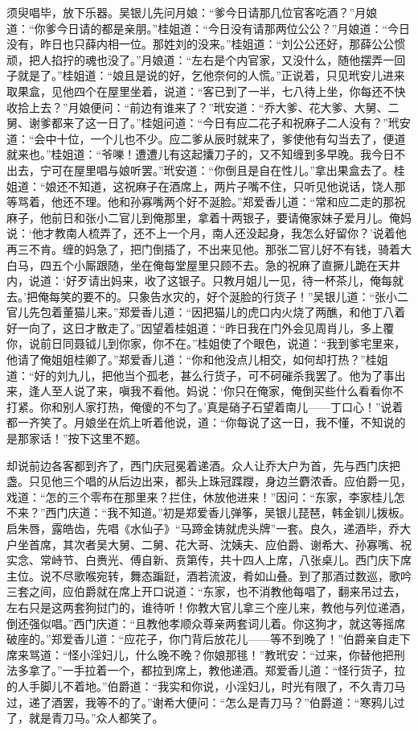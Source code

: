 须臾唱毕，放下乐器。吴银儿先问月娘：“爹今日请那几位官客吃酒？”月娘道：“你爹今日请的都是亲朋。”桂姐道：“今日没有请那两位公公？”月娘道：“今日没有，昨日也只薛内相一位。那姓刘的没来。”桂姐道：“刘公公还好，那薛公公惯顽，把人掐拧的魂也没了。”月娘道：“左右是个内官家，又没什么，随他摆弄一回子就是了。”桂姐道：“娘且是说的好，乞他奈何的人慌。”正说着，只见玳安儿进来取果盒，见他四个在屋里坐着，说道：“客已到了一半，七八待上坐，你每还不快收拾上去？”月娘便问：“前边有谁来了？”玳安道：“乔大爹、花大爹、大舅、二舅、谢爹都来了这一日了。”桂姐问道：“今日有应二花子和祝麻子二人没有？”玳安道：“会中十位，一个儿也不少。应二爹从辰时就来了，爹使他有勾当去了，便道就来也。”桂姐道：“爷嚛！遭遭儿有这起攮刀子的，又不知缠到多早晚。我今日不出去，宁可在屋里唱与娘听罢。”玳安道：“你倒且是自在性儿。”拿出果盒去了。桂姐道：“娘还不知道，这祝麻子在酒席上，两片子嘴不住，只听见他说话，饶人那等骂着，他还不理。他和孙寡嘴两个好不涎脸。”郑爱香儿道：“常和应二走的那祝麻子，他前日和张小二官儿到俺那里，拿着十两银子，要请俺家妹子爱月儿。俺妈说：‘他才教南人梳弄了，还不上一个月，南人还没起身，我怎么好留你？’说着他再三不肯。缠的妈急了，把门倒插了，不出来见他。那张二官儿好不有钱，骑着大白马，四五个小厮跟随，坐在俺每堂屋里只顾不去。急的祝麻了直撅儿跪在天井内，说道：‘好歹请出妈来，收了这银子。只教月姐儿一见，待一杯茶儿，俺每就去。’把俺每笑的要不的。只象告水灾的，好个涎脸的行货子！”吴银儿道：“张小二官儿先包着董猫儿来。”郑爱香儿道：“因把猫儿的虎口内火烧了两醮，和他丁八着好一向了，这日才散走了。”因望着桂姐道：“昨日我在门外会见周肖儿，多上覆你，说前日同聂钺儿到你家，你不在。”桂姐使了个眼色，说道：“我到爹宅里来，他请了俺姐姐桂卿了。”郑爱香儿道：“你和他没点儿相交，如何却打热？”桂姐道：“好的刘九儿，把他当个孤老，甚么行货子，可不砢磪杀我罢了。他为了事出来，逢人至人说了来，嗔我不看他。妈说：‘你只在俺家，俺倒买些什么看看你不打紧。你和别人家打热，俺傻的不匀了。’真是硝子石望着南儿——丁口心！”说着都一齐笑了。月娘坐在炕上听着他说，道：“你每说了这一日，我不懂，不知说的是那家话！”按下这里不题。

却说前边各客都到齐了，西门庆冠冕着递酒。众人让乔大户为首，先与西门庆把盏。只见他三个唱的从后边出来，都头上珠冠蹀躞，身边兰麝浓香。应伯爵一见，戏道：“怎的三个零布在那里来？拦住，休放他进来！”因问：“东家，李家桂儿怎不来？”西门庆道：“我不知道。”初是郑爱香儿弹筝，吴银儿琵琶，韩金钏儿拨板。启朱唇，露皓齿，先唱《水仙子》“马蹄金铸就虎头牌”一套。良久，递酒毕，乔大户坐首席，其次者吴大舅、二舅、花大哥、沈姨夫、应伯爵、谢希大、孙寡嘴、祝实念、常峙节、白赉光、傅自新、贲第传，共十四人上席，八张桌儿。西门庆下席主位。说不尽歌喉宛转，舞态蹁跹，酒若流波，肴如山叠。到了那酒过数巡，歌吟三套之间，应伯爵就在席上开口说道：“东家，也不消教他每唱了，翻来吊过去，左右只是这两套狗挝门的，谁待听！你教大官儿拿三个座儿来，教他与列位递酒，倒还强似唱。”西门庆道：“且教他孝顺众尊亲两套词儿着。你这狗才，就这等摇席破座的。”郑爱香儿道：“应花子，你门背后放花儿——等不到晚了！”伯爵亲自走下席来骂道：“怪小淫妇儿，什么晚不晚？你娘那毴！”教玳安：“过来，你替他把刑法多拿了。”一手拉着一个，都拉到席上，教他递酒。郑爱香儿道：“怪行货子，拉的人手脚儿不着地。”伯爵道：“我实和你说，小淫妇儿，时光有限了，不久青刀马过，递了酒罢，我等不的了。”谢希大便问：“怎么是青刀马？”伯爵道：“寒鸦儿过了，就是青刀马。”众人都笑了。

